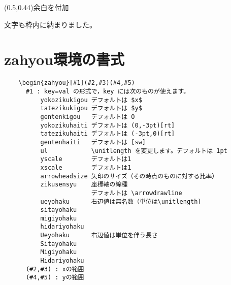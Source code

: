 \documentclass[a4j]{jarticle}
\begin{document}
\begin{showEx}(0.5,0.44){余白を付加}
\fboxsep=0pt
\end{showEx}
文字も枠内に納まりました。

\section{\textsf{zahyou}環境の書式}
\begin{boxnote}
\begin{verbatim}
    \begin{zahyou}[#1](#2,#3)(#4,#5)
      #1 : key=val の形式で，key には次のものが使えます。
          yokozikukigou デフォルトは $x$
          tatezikukigou デフォルトは $y$
          gentenkigou   デフォルトは O
          yokozikuhaiti デフォルトは (0,-3pt)[rt]
          tatezikuhaiti デフォルトは (-3pt,0)[rt]
          gentenhaiti   デフォルトは [sw]
          ul            \unitlength を変更します。デフォルトは 1pt
          yscale        デフォルトは1
          xscale        デフォルトは1
          arrowheadsize 矢印のサイズ（その時点のものに対する比率）
          zikusensyu    座標軸の線種
                        デフォルトは \arrowdrawline
          ueyohaku      右辺値は無名数（単位は\unitlength)
          sitayohaku
          migiyohaku
          hidariyohaku
          Ueyohaku      右辺値は単位を伴う長さ
          Sitayohaku
          Migiyohaku
          Hidariyohaku
      (#2,#3) : xの範囲
      (#4,#5) : yの範囲
\end{verbatim}
\end{boxnote}
\end{document}
